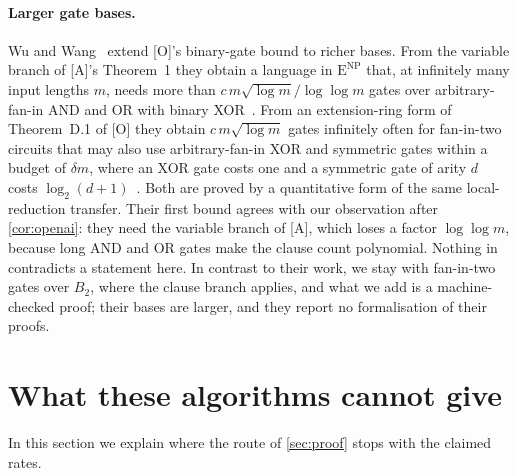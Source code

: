\documentclass[10pt]{amsart}
\theoremstyle{plain}
\theoremstyle{definition}
\theoremstyle{remark}
\numberwithin{equation}{section}
\newcommand{\ENP}{\mathrm{E}^{\mathrm{NP}}}
\newcommand{\A}{\textup{[A]}}
\newcommand{\Oa}{\textup{[O]}}
\begin{document}
\paragraph{Larger gate bases.} Wu and Wang~\cite{WW26} extend \Oa's binary-gate bound to richer
bases. From the variable branch of \A's Theorem~1 they obtain a language in $\ENP$ that, at
infinitely many input lengths $m$, needs more than $c\,m\sqrt{\log m}/\log\log m$ gates over
arbitrary-fan-in AND and OR with binary XOR~\cite[Theorem~1]{WW26}. From an extension-ring form of
Theorem~D.1 of \Oa{} they obtain $c\,m\sqrt{\log m}$ gates infinitely often for fan-in-two circuits
that may also use arbitrary-fan-in XOR and symmetric gates within a budget of $\delta m$, where an
XOR gate costs one and a symmetric gate of arity $d$ costs $\log_2(d+1)$~\cite[Theorem~2]{WW26}.
Both are proved by a quantitative form of the same local-reduction transfer. Their first
bound agrees with our observation after \cref{cor:openai}: they need the variable branch of \A,
which loses a factor $\log\log m$, because long AND and OR gates make the clause count polynomial.
Nothing in~\cite{WW26} contradicts a statement here. In contrast to their work, we stay with
fan-in-two gates over $B_2$, where the clause branch applies, and what we add is a machine-checked
proof; their bases are larger, and they report no formalisation of their proofs.

\section{What these algorithms cannot give}\label{sec:limits}

In this section we explain where the route of \cref{sec:proof} stops with the claimed rates.
\end{document}
